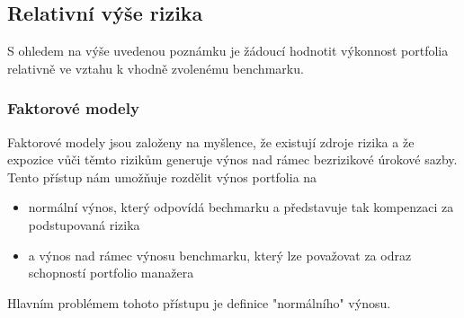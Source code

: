 \documentclass[a4paper]{book}
\begin{document}
\subsection{Relativní výše rizika}

S ohledem na výše uvedenou poznámku je žádoucí hodnotit výkonnost portfolia relativně ve vztahu k vhodně zvolenému benchmarku.

\subsubsection{Faktorové modely}

Faktorové modely jsou založeny na myšlence, že existují zdroje rizika a že expozice vůči těmto rizikům generuje výnos nad rámec bezrizikové úrokové sazby. Tento přístup nám umožňuje rozdělit výnos portfolia na
\begin{itemize}
\item normální výnos, který odpovídá bechmarku a představuje tak kompenzaci za podstupovaná rizika
\item a výnos nad rámec výnosu benchmarku, který lze považovat za odraz schopností portfolio manažera
\end{itemize}
Hlavním problémem tohoto přístupu je definice "normálního" výnosu.
\end{document}
